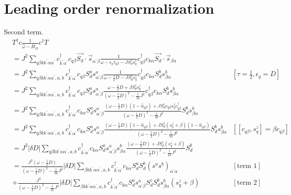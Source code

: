 \documentclass[12pt]{article}
\begin{document}
\section{Leading order renormalization}
Second term.
\begin{equation}\begin{aligned}
	&T^\dagger c \frac{1}{\hat \omega - H_D}c^\dagger T \\
	&= J^2\sum_{q\beta k k^\prime \alpha \alpha^\prime} c^\dagger_{k^\prime\alpha^\prime} c_{q\beta} \vec{S_d}\cdot\vec{s}_{\alpha^\prime \beta } \frac{1}{\omega - \epsilon_q\tau_{q\beta} - J S_d^z s_q^z}c^\dagger_{q\beta} c_{k\alpha} \vec{S_d}\cdot\vec{s}_{ \beta\alpha}\\
	&= J^2\sum_{q\beta k k^\prime \alpha \alpha^\prime,a,b} c^\dagger_{k^\prime\alpha^\prime} c_{q\beta} S_d^a s^a_{\alpha^\prime \beta} \frac{1}{\omega - \frac{1}{2}D - J S_d^z s_q^z}c^\dagger_{q\beta} c_{k\alpha} S_d^b s^b_{\beta \alpha} & \left[\tau = \frac{1}{2}, \epsilon_q = D\right] \\
	&= J^2\sum_{q\beta k k^\prime \alpha \alpha^\prime,a,b} c^\dagger_{k^\prime\alpha^\prime} c_{q\beta} S_d^a s^a_{\alpha^\prime \beta} \frac{\omega - \frac{1}{2}D + J S_d^z s_q^z}{\left(\omega - \frac{1}{2}D\right)^2 - \frac{1}{16}J^2}c^\dagger_{q\beta} c_{k\alpha} S_d^b s^b_{\beta \alpha} \\
	&= J^2\sum_{q\beta k k^\prime \alpha \alpha^\prime,a,b} c^\dagger_{k^\prime\alpha^\prime} c_{k\alpha} S_d^a s^a_{\alpha^\prime \beta} \frac{\left(\omega - \frac{1}{2}D\right) \left(1 - \hat n_{q\beta}\right) +  J S_d^z c_{q\beta} s_q^z c^\dagger_{q\beta}}{\left(\omega - \frac{1}{2}D\right)^2 - \frac{1}{16}J^2} S_d^b s^b_{\beta \alpha} \\
	&= J^2\sum_{q\beta k k^\prime \alpha \alpha^\prime,a,b} c^\dagger_{k^\prime\alpha^\prime} c_{k\alpha} S_d^a s^a_{\alpha^\prime \beta} \frac{\left(\omega - \frac{1}{2}D\right) \left(1 - \hat n_{q\beta}\right) +  J S_d^z \left(s_q^z + \beta\right) \left(1- \hat n_{q\beta}\right)}{\left(\omega - \frac{1}{2}D\right)^2 - \frac{1}{16}J^2} S_d^b s^b_{\beta \alpha} & \left[\left[c_{q\beta}, s_q^z\right] = \beta c_{q\beta}\right] \\
	&= J^2 |\delta D|\sum_{q\beta k k^\prime \alpha \alpha^\prime,a,b} c^\dagger_{k^\prime\alpha^\prime} c_{k\alpha} S_d^a s^a_{\alpha^\prime \beta}s^b_{\beta \alpha} \frac{\left(\omega - \frac{1}{2}D\right) + J S_d^z \left(s_q^z + \beta\right)}{\left(\omega - \frac{1}{2}D\right)^2 - \frac{1}{16}J^2} S_d^b  \\
	&= \frac{J^2\left(\omega - \frac{1}{2}D\right)}{\left(\omega - \frac{1}{2}D\right)^2 - \frac{1}{16}J^2}|\delta D| \sum_{\beta k k^\prime \alpha \alpha^\prime,a,b} c^\dagger_{k^\prime\alpha^\prime} c_{k\alpha} S_d^a  S_d^b \left(s^a s^b\right)_{\alpha^\prime \alpha} & \left[\text{term 1}\right]\\
	&+ \frac{J^3}{\left(\omega - \frac{1}{2}D\right)^2 - \frac{1}{16}J^2} |\delta D|\sum_{\beta k k^\prime \alpha \alpha^\prime,a,b} c^\dagger_{k^\prime\alpha^\prime} c_{k\alpha} S_d^a s^a_{\alpha^\prime \beta} S_d^z S_d^b s^b_{\beta \alpha} \left(s_q^z + \beta\right) & \left[\text{term 2}\right] \\
\end{aligned}\end{equation}
\end{document}
